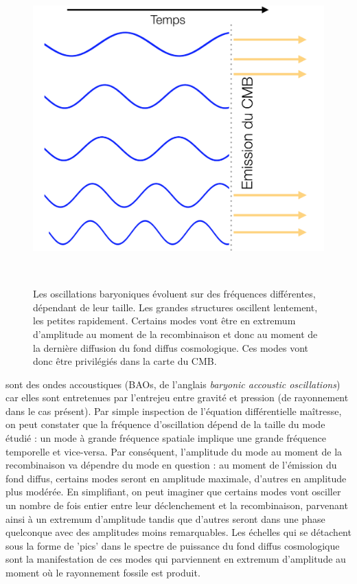 \begin{figure}[htbp]
	\centering
		\includegraphics[height=12cm]{figs/bao1.png}
	\caption[Les oscillations baryoniques évoluent sur des fréquences différentes, dépendant de leur taille.]{Les oscillations baryoniques évoluent sur des fréquences différentes, dépendant de leur taille. Les grandes structures oscillent lentement, les petites rapidement. Certains modes vont être en extremum d'amplitude au moment de la recombinaison et donc au moment de la dernière diffusion du fond diffus cosmologique. Ces modes vont donc être privilégiés dans la carte du CMB.}
	\label{f:bao1}
\end{figure}


  sont des ondes accoustiques (BAOs, de l'anglais \textit{baryonic accoustic oscillations}) car elles sont entretenues par l'entrejeu entre gravité et pression (de rayonnement dans le cas présent). Par simple inspection de l'équation différentielle maîtresse, on peut constater que la fréquence d'oscillation dépend de la taille du mode étudié : un mode à grande fréquence spatiale implique une grande fréquence temporelle et vice-versa. Par conséquent, l'amplitude du mode au moment de la recombinaison va dépendre du mode en question : au moment de l'émission du fond diffus, certains modes seront en amplitude maximale, d'autres en amplitude plus modérée. En simplifiant, on peut imaginer que certains modes vont osciller un nombre de fois entier entre leur déclenchement et la recombinaison, parvenant ainsi à un extremum d'amplitude tandis que d'autres seront dans une phase quelconque avec des amplitudes moins remarquables. Les échelles qui se détachent sous la forme de 'pics' dans le spectre de puissance du fond diffus cosmologique sont la manifestation de ces modes qui parviennent en extremum d'amplitude au moment où le rayonnement fossile est produit.



